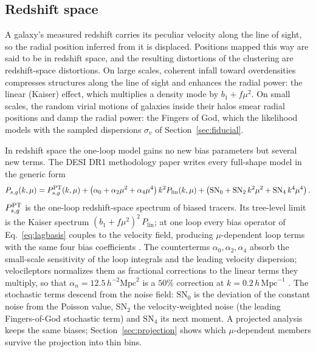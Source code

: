 \documentclass[11pt]{article}
\newcommand{\bone}{b_1}            %
\newcommand{\plin}{P_{\mathrm{lin}}}
\newcommand{\hMpc}{\,h\,\mathrm{Mpc}^{-1}}
\newcommand{\aunit}{\,h^{-2}\mathrm{Mpc}^2}
\newcommand{\SNz}{\mathrm{SN}_0}
\newcommand{\SNt}{\mathrm{SN}_2}
\begin{document}
\subsection{Redshift space}
\label{sec:redshift-space}

A galaxy's measured redshift carries its peculiar velocity along the
line of sight, so the radial position inferred from it is displaced.
Positions mapped this way are said to be in redshift space, and the
resulting distortions of the clustering are redshift-space
distortions.  On large scales, coherent infall toward overdensities
compresses structures along the line of sight and enhances the radial
power: the linear (Kaiser) effect, which multiplies a density mode by
$\bone + f\mu^2$.  On small scales, the random virial motions of
galaxies inside their halos smear radial positions and damp the radial
power: the Fingers of God, which the likelihood models with the
sampled dispersions $\sigma_v$ of Section~\ref{sec:fiducial}.

In redshift space the one-loop model gains no new bias parameters but
several new terms.  The DESI DR1 methodology paper \cite{DESI2024V}
writes every full-shape model in the generic form
\begin{equation}
P_{s,g}(k,\mu) = P^{\rm PT}_{s,g}(k,\mu)
 + \left(\alpha_0 + \alpha_2\mu^2 + \alpha_4\mu^4\right) k^2
   \plin(k,\mu)
 + \left(\SNz + \SNt\,k^2\mu^2 + \mathrm{SN}_4\,k^4\mu^4\right) .
\label{eq:desi-generic}
\end{equation}
$P^{\rm PT}_{s,g}$ is the one-loop redshift-space spectrum of biased
tracers.  Its tree-level limit is the Kaiser spectrum
$(\bone + f\mu^2)^2\,\plin$; at one loop every bias operator of
Eq.~\eqref{eq:lagbasis} couples to the velocity field, producing
$\mu$-dependent loop terms with the same four bias coefficients
\cite{ChenVlahWhite2020,Maus2024}.  The counterterms
$\alpha_0,\alpha_2,\alpha_4$ absorb the small-scale sensitivity of the
loop integrals and the leading velocity dispersion; velocileptors
normalizes them as fractional corrections to the linear terms they
multiply, so that $\alpha_n = 12.5\aunit$ is a $50\%$ correction at
$k = 0.2\hMpc$ \cite{Maus2024}.  The stochastic terms descend from the
noise field: $\SNz$ is the deviation of the constant noise from the
Poisson value, $\SNt$ the velocity-weighted noise (the leading
Fingers-of-God stochastic term) and $\mathrm{SN}_4$ its next moment.
A projected analysis keeps the same biases;
Section~\ref{sec:projection} shows which $\mu$-dependent members
survive the projection into thin bins.
\end{document}
